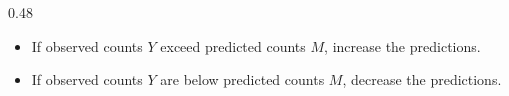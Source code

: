 \documentclass{beamer}
\begin{document}
\begin{frame}
\begin{columns}[T,onlytextwidth]
\begin{column}{0.48\textwidth}
            \begin{itemize}
                \item If observed counts \(Y\) exceed predicted counts \(M\), increase the predictions.



                \item If observed counts \(Y\) are below predicted counts \(M\), decrease the predictions.
            \end{itemize}
            
        \end{column}

    \end{columns}
\end{frame}
\end{document}
